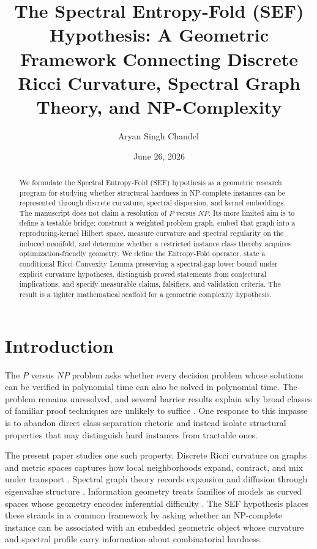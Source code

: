 \documentclass{svjour3}
\title{The Spectral Entropy-Fold (SEF) Hypothesis: A Geometric Framework Connecting Discrete Ricci Curvature, Spectral Graph Theory, and NP-Complexity}
\author{Aryan Singh Chandel\,\orcidlink{0009-0007-1774-2480}}
\institute{Aryan Singh Chandel \at
RJIT (Rustamji Institute of Technology), Gwalior, India \\
\email{aryansingh19gh@gmail.com}}
\date{June 26, 2026}
\begin{document}
\maketitle

\begin{abstract}
We formulate the Spectral Entropy-Fold (SEF) hypothesis as a geometric research program for studying whether structural hardness in NP-complete instances can be represented through discrete curvature, spectral dispersion, and kernel embeddings. The manuscript does not claim a resolution of $P$ versus $NP$. Its more limited aim is to define a testable bridge: construct a weighted problem graph, embed that graph into a reproducing-kernel Hilbert space, measure curvature and spectral regularity on the induced manifold, and determine whether a restricted instance class thereby acquires optimization-friendly geometry. We define the Entropy-Fold operator, state a conditional Ricci-Convexity Lemma preserving a spectral-gap lower bound under explicit curvature hypotheses, distinguish proved statements from conjectural implications, and specify measurable claims, falsifiers, and validation criteria. The result is a tighter mathematical scaffold for a geometric complexity hypothesis.
\end{abstract}

\section{Introduction}
The $P$ versus $NP$ problem asks whether every decision problem whose solutions can be verified in polynomial time can also be solved in polynomial time. The problem remains unresolved, and several barrier results explain why broad classes of familiar proof techniques are unlikely to suffice \citep{cook1971complexity,baker1975relativizations,razborov1997natural,aaronson2009algebrization}. One response to this impasse is to abandon direct class-separation rhetoric and instead isolate structural properties that may distinguish hard instances from tractable ones.

The present paper studies one such property. Discrete Ricci curvature on graphs and metric spaces captures how local neighborhoods expand, contract, and mix under transport \citep{ollivier2009ricci,lin2011ricci}. Spectral graph theory records expansion and diffusion through eigenvalue structure \citep{chung1997spectral}. Information geometry treats families of models as curved spaces whose geometry encodes inferential difficulty \citep{amari2016information}. The SEF hypothesis places these strands in a common framework by asking whether an NP-complete instance can be associated with an embedded geometric object whose curvature and spectral profile carry information about combinatorial hardness.
\end{document}
